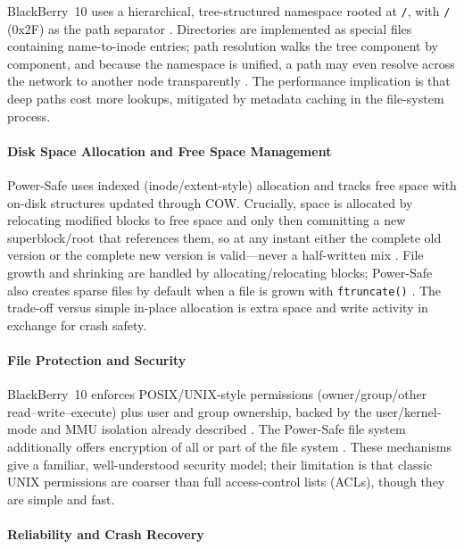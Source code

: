 BlackBerry~10 uses a hierarchical, tree-structured namespace rooted at
\texttt{/}, with \texttt{/} (0x2F) as the path separator
\citep{qnx_powersafe_fs}.
Directories are implemented as special files containing name-to-inode
entries; path resolution walks the tree component by component, and
because the namespace is unified, a path may even resolve across the
network to another node transparently \citep{qnx_ipc, qnx_powersafe_fs}.
The performance implication is that deep paths cost more lookups,
mitigated by metadata caching in the file-system process.

\paragraph{Disk Space Allocation and Free Space Management}

Power-Safe uses indexed (inode/extent-style) allocation and tracks free
space with on-disk structures updated through COW. Crucially, space is
allocated by relocating modified blocks to free space and only then
committing a new superblock/root that references them, so at any
instant either the complete old version or the complete new version is
valid---never a half-written mix \citep{qnx_fs_fault_tolerance}. File
growth and shrinking are handled by allocating/relocating blocks;
Power-Safe also creates sparse files by default when a file is grown
with \texttt{ftruncate()} \citep{qnx_powersafe_fs}. The trade-off
versus simple in-place allocation is extra space and write activity in
exchange for crash safety.

\paragraph{File Protection and Security}

BlackBerry~10 enforces POSIX/UNIX-style permissions (owner/group/other
read--write--execute) plus user and group ownership, backed by the
user/kernel-mode and MMU isolation already described
\citep{qnx_memman, qnx_neutrino_overview}. The Power-Safe file system
additionally offers encryption of all or part of the file system
\citep{qnx_powersafe_fs}. These mechanisms give a familiar,
well-understood security model; their limitation is that classic UNIX
permissions are coarser than full access-control lists (ACLs), though
they are simple and fast.

\paragraph{Reliability and Crash Recovery}


